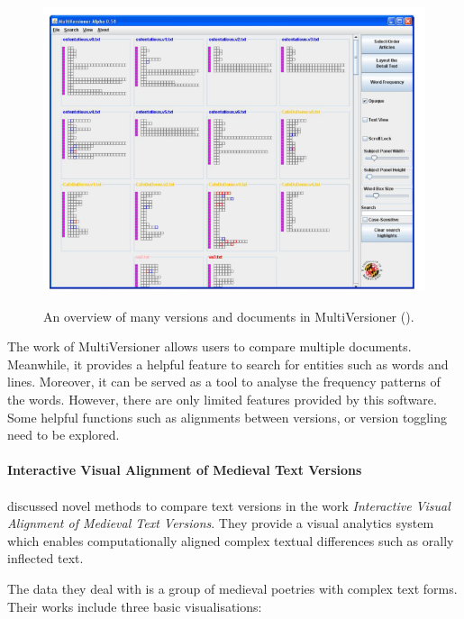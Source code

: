 \begin{figure}[H]
	\centering    
	\includegraphics[width=\textwidth]{Figs/MultiVersioner}\\[1ex]
	\caption{An overview of many versions and documents in MultiVersioner (\cite{Jong2008}).}
	\label{fig:multiVersioner}
\end{figure} 

The work of MultiVersioner allows users to compare multiple documents. Meanwhile, it provides a helpful feature to search for entities such as words and lines. Moreover, it can be served as a tool to analyse the frequency patterns of the words. However, there are only limited features provided by this software. Some helpful functions such as alignments between versions, or version toggling need to be explored.

\paragraph{Interactive Visual Alignment of Medieval Text Versions}
\paragraph[]{}

\cite{Stefan2017} discussed novel methods to compare text versions in the work \emph{Interactive Visual Alignment of Medieval Text Versions}. They provide a visual analytics system which enables computationally aligned complex textual differences such as orally inflected text. 

The data they deal with is a group of medieval poetries with complex text forms. Their works include three basic visualisations:

